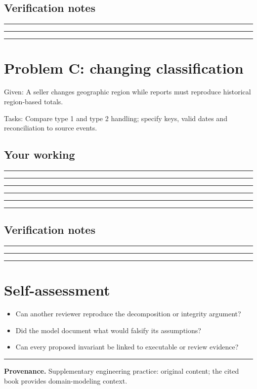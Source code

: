\documentclass[11pt,letterpaper]{article}
\newcommand{\ResponseLine}{\par\vspace{1.05em}\noindent\rule{\linewidth}{0.4pt}\par}
\newcommand{\ResponseArea}{\ResponseLine\ResponseLine\ResponseLine}
\begin{document}
\subsection{Verification notes}
\ResponseArea

\section{Problem C: changing classification}
Given: A seller changes geographic region while reports must reproduce historical region-based totals.

Tasks: Compare type 1 and type 2 handling; specify keys, valid dates and reconciliation to source events.

\subsection{Your working}
\ResponseArea\ResponseArea
\subsection{Verification notes}
\ResponseArea

\section{Self-assessment}
\begin{itemize}
\item Can another reviewer reproduce the decomposition or integrity argument?
\item Did the model document what would falsify its assumptions?
\item Can every proposed invariant be linked to executable or review evidence?
\end{itemize}

\vfill
\hrule
{\footnotesize\textbf{Provenance.} Supplementary engineering practice: original content; the cited book provides domain-modeling context.}
\end{document}
